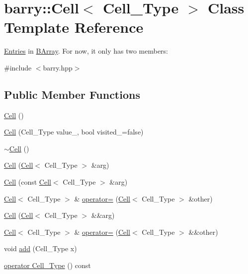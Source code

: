 \hypertarget{classbarry_1_1_cell}{}\section{barry\+:\+:Cell$<$ Cell\+\_\+\+Type $>$ Class Template Reference}
\label{classbarry_1_1_cell}


\hyperlink{classbarry_1_1_entries}{Entries} in \hyperlink{classbarry_1_1_b_array}{B\+Array}. For now, it only has two members\+:  




{\ttfamily \#include $<$barry.\+hpp$>$}

\subsection*{Public Member Functions}
\begin{DoxyCompactItemize}
\item 
\hyperlink{classbarry_1_1_cell_aa7beee933fc291cbc4ac84ec3ab63352}{Cell} ()
\item 
\hyperlink{classbarry_1_1_cell_ae315476489673759fad689eb2f8ce952}{Cell} (Cell\+\_\+\+Type value\+\_\+, bool visited\+\_\+=false)
\item 
\hyperlink{classbarry_1_1_cell_a2500924b447d4d881916749041974d81}{$\sim$\+Cell} ()
\item 
\hyperlink{classbarry_1_1_cell_af56de393207da4be4cf7e50f7d862613}{Cell} (\hyperlink{classbarry_1_1_cell}{Cell}$<$ Cell\+\_\+\+Type $>$ \&arg)
\item 
\hyperlink{classbarry_1_1_cell_ab825f94a5de98ae455224b0720f369f5}{Cell} (const \hyperlink{classbarry_1_1_cell}{Cell}$<$ Cell\+\_\+\+Type $>$ \&arg)
\item 
\hyperlink{classbarry_1_1_cell}{Cell}$<$ Cell\+\_\+\+Type $>$ \& \hyperlink{classbarry_1_1_cell_a6cfdc588dba9ca10a11693d644ac0c60}{operator=} (\hyperlink{classbarry_1_1_cell}{Cell}$<$ Cell\+\_\+\+Type $>$ \&other)
\item 
\hyperlink{classbarry_1_1_cell_ae9866b9e53155b7521b5b166e77e542a}{Cell} (\hyperlink{classbarry_1_1_cell}{Cell}$<$ Cell\+\_\+\+Type $>$ \&\&arg)
\item 
\hyperlink{classbarry_1_1_cell}{Cell}$<$ Cell\+\_\+\+Type $>$ \& \hyperlink{classbarry_1_1_cell_a775ee69aabe8581d9fb2a3729d49a5df}{operator=} (\hyperlink{classbarry_1_1_cell}{Cell}$<$ Cell\+\_\+\+Type $>$ \&\&other)
\item 
void \hyperlink{classbarry_1_1_cell_a40c9aad3ba2c9d5a1a91833c66522ad8}{add} (Cell\+\_\+\+Type x)
\item 
\hyperlink{classbarry_1_1_cell_a90bea0b3306e1780747ca1ef6f389e91}{operator Cell\+\_\+\+Type} () const
\end{DoxyCompactItemize}
